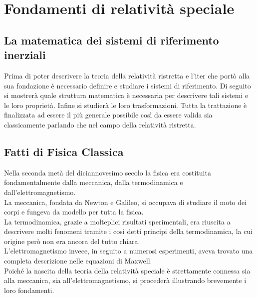 \documentclass[12pt,a4paper]{report}
\numberwithin{equation}{section}
\begin{document}




\tableofcontents



\chapter{Fondamenti di relatività speciale}

\section{La matematica dei sistemi di riferimento inerziali}
\label{sec:MathSDRI}
Prima di poter descrivere la teoria della relatività ristretta e l'iter che portò alla sua fondazione è necessario definire e studiare i sistemi di riferimento. Di seguito si mostrerà quale struttura matematica è necessaria per descrivere tali sistemi e le loro proprietà. Infine si studierà le loro trasformazioni. Tutta la trattazione è finalizzata ad essere il più generale possibile così da essere valida sia classicamente parlando che nel campo della relatività ristretta.



\section{Fatti di Fisica Classica}
Nella seconda metà del diciannovesimo secolo la fisica era costituita fondamentalmente dalla meccanica, 
dalla termodinamica e dall'elettromagnetismo.\\ La meccanica, fondata da Newton e Galileo, si occupava di studiare il 
moto dei corpi e fungeva da modello per tutta la fisica.\\La termodinamica, grazie a molteplici risultati sperimentali, era riuscita a descrivere molti fenomeni tramite i così detti principi della termodinamica, la cui origine però non era ancora del tutto chiara.\\L'elettromagnetismo invece, in seguito 
a numerosi esperimenti, aveva trovato una completa descrizione nelle equazioni di Maxwell.\\
Poiché la nascita della teoria della relatività speciale è strettamente connessa sia alla meccanica, sia all'elettromagnetismo, si procederà illustrando brevemente i loro fondamenti. 




\end{document}
